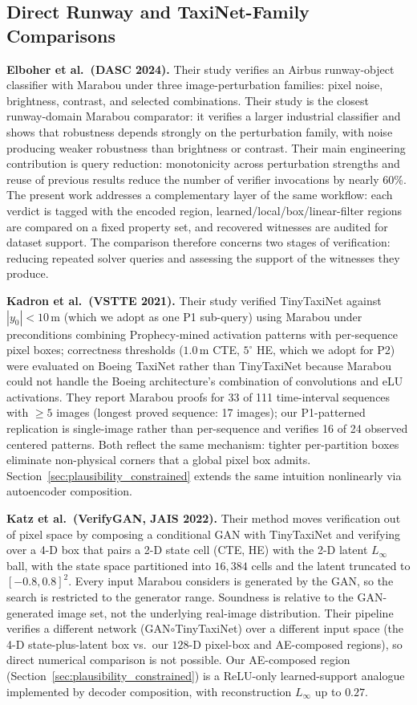 \documentclass[twocolumn,smallextended,runningheads]{svjour3}
\begin{document}
\subsection{Direct Runway and TaxiNet-Family Comparisons}

\textbf{Elboher et al.\ (DASC 2024).} Their study verifies an Airbus runway-object classifier with Marabou under three image-perturbation families: pixel noise, brightness, contrast, and selected combinations. Their study is the closest runway-domain Marabou comparator: it verifies a larger industrial classifier and shows that robustness depends strongly on the perturbation family, with noise producing weaker robustness than brightness or contrast. Their main engineering contribution is query reduction: monotonicity across perturbation strengths and reuse of previous results reduce the number of verifier invocations by nearly 60\%. The present work addresses a complementary layer of the same workflow: each verdict is tagged with the encoded region, learned/local/box/linear-filter regions are compared on a fixed property set, and recovered witnesses are audited for dataset support. The comparison therefore concerns two stages of verification: reducing repeated solver queries and assessing the support of the witnesses they produce.

\textbf{Kadron et al.\ (VSTTE 2021).} Their study verified TinyTaxiNet against $|y_0| < 10$\,m (which we adopt as one P1 sub-query) using Marabou under preconditions combining Prophecy-mined activation patterns with per-sequence pixel boxes; correctness thresholds ($1.0$\,m CTE, $5^\circ$ HE, which we adopt for P2) were evaluated on Boeing TaxiNet rather than TinyTaxiNet because Marabou could not handle the Boeing architecture's combination of convolutions and eLU activations. They report Marabou proofs for 33 of 111 time-interval sequences with $\ge 5$ images (longest proved sequence: 17 images); our P1-patterned replication is single-image rather than per-sequence and verifies 16 of 24 observed centered patterns. Both reflect the same mechanism: tighter per-partition boxes eliminate non-physical corners that a global pixel box admits. Section~\ref{sec:plausibility_constrained} extends the same intuition nonlinearly via autoencoder composition.

\textbf{Katz et al.\ (VerifyGAN, JAIS 2022).} Their method moves verification out of pixel space by composing a conditional GAN with TinyTaxiNet and verifying over a 4-D box that pairs a 2-D state cell (CTE, HE) with the 2-D latent $L_\infty$ ball, with the state space partitioned into $16{,}384$ cells and the latent truncated to $[-0.8, 0.8]^2$. Every input Marabou considers is generated by the GAN, so the search is restricted to the generator range. Soundness is relative to the GAN-generated image set, not the underlying real-image distribution. Their pipeline verifies a different network (GAN$\circ$TinyTaxiNet) over a different input space (the 4-D state-plus-latent box vs.\ our $128$-D pixel-box and AE-composed regions), so direct numerical comparison is not possible. Our AE-composed region (Section~\ref{sec:plausibility_constrained}) is a ReLU-only learned-support analogue implemented by decoder composition, with reconstruction $L_\infty$ up to $0.27$.
\end{document}
